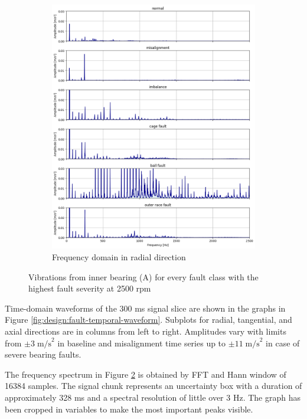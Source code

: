 \begin{figure}[h]
\begin{subfigure}[b]{0.50\textwidth}
        \includegraphics[width=\textwidth]{assets/results/eda/mafaulda-faults.png}
        \caption{Frequency domain in radial direction}
        \label{fig:design:fault-spectral-waveform}
    \end{subfigure}
    \caption{Vibrations from inner bearing (A) for every fault class with the highest fault severity at 2500 rpm}
\end{figure}

Time-domain waveforms of the 300 ms signal slice are shown in the graphs in Figure \ref{fig:design:fault-temporal-waveform}. Subplots for radial, tangential, and axial directions are in columns from left to right. Amplitudes vary with limits from $\pm 3\; \mathrm{m/s}^2$ in baseline and misalignment time series up to $\pm 11\;\mathrm{m/s}^2$ in case of severe bearing faults. 

The frequency spectrum in Figure \ref{fig:design:fault-spectral-waveform} is obtained by FFT and Hann window of 16384 samples. The signal chunk represents an uncertainty box with a duration of approximately 328 ms and a spectral resolution of little over 3 Hz. The graph has been cropped in variables to make the most important peaks visible.

